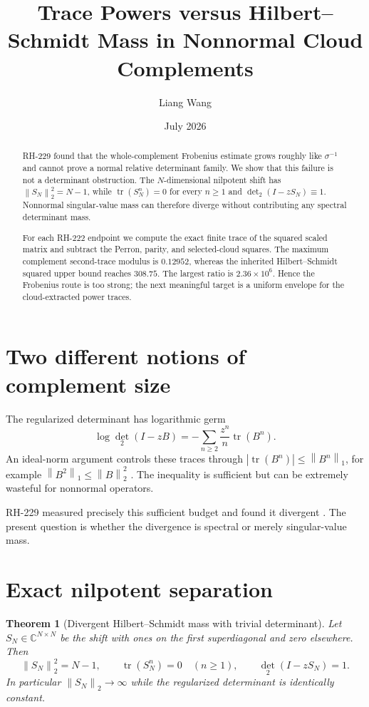 \documentclass[11pt]{article}
\title{Trace Powers versus Hilbert--Schmidt Mass in Nonnormal Cloud Complements}
\author{Liang Wang}
\date{July 2026}
\newtheorem{theorem}{Theorem}[section]
\theoremstyle{remark}
\newcommand{\norm}[1]{\left\lVert#1\right\rVert}
\begin{document}
\maketitle

\begin{abstract}
RH-229 found that the whole-complement Frobenius estimate grows roughly like
$\sigma^{-1}$ and cannot prove a normal relative determinant family.  We
show that this failure is not a determinant obstruction.  The $N$-dimensional
nilpotent shift has $\norm{S_N}_2^2=N-1$, while
$\operatorname{tr}(S_N^n)=0$ for every $n\ge1$ and
$\det_2(I-zS_N)\equiv1$.  Nonnormal singular-value mass can therefore diverge
without contributing any spectral determinant mass.

For each RH-222 endpoint we compute the exact finite trace of the squared
scaled matrix and subtract the Perron, parity, and selected-cloud squares.
The maximum complement second-trace modulus is $0.12952$, whereas the
inherited Hilbert--Schmidt squared upper bound reaches $308.75$.  The largest
ratio is $2.36\times10^6$.  Hence the Frobenius route is too strong; the next
meaningful target is a uniform envelope for the cloud-extracted power traces.
\end{abstract}

\section{Two different notions of complement size}

The regularized determinant has logarithmic germ
\[
 \log\det_2(I-zB)=-\sum_{n\ge2}\frac{z^n}{n}\operatorname{tr}(B^n).
\]
An ideal-norm argument controls these traces through
$|\operatorname{tr}(B^n)|\le\norm{B^n}_1$, for example
$\norm{B^2}_1\le\norm B_2^2$ \citep{Simon2005}.  The inequality is sufficient
but can be extremely wasteful for nonnormal operators.

RH-229 measured precisely this sufficient budget and found it divergent
\citep{WangRH229}.  The present question is whether the divergence is spectral
or merely singular-value mass.

\section{Exact nilpotent separation}

\begin{theorem}[Divergent Hilbert--Schmidt mass with trivial determinant]
Let $S_N\in\mathbb C^{N\times N}$ be the shift with ones on the first
superdiagonal and zero elsewhere.  Then
\[
 \norm{S_N}_2^2=N-1,
 \qquad
 \operatorname{tr}(S_N^n)=0\quad(n\ge1),
 \qquad
 \det_2(I-zS_N)=1.
\]
In particular $\norm{S_N}_2\to\infty$ while the regularized determinant is
identically constant.
\end{theorem}
\end{document}
